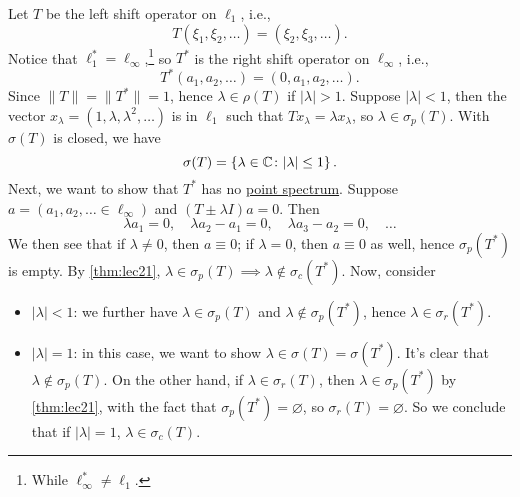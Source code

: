 \begin{eg}
	Let \(T\) be the left shift operator on \(\ell _1\), i.e.,
	\[
		T(\xi _1, \xi _2, \ldots  )= (\xi _2, \xi _3, \ldots  ).
	\]
	Notice that \(\ell _1^{\ast} = \ell _\infty \),\footnote{While \(\ell ^{\ast} _\infty \neq \ell _1\).} so \(T^{\ast} \) is the right shift operator on \(\ell _\infty \), i.e.,
	\[
		T^{\ast} (a_1, a_2, \ldots  ) = (0, a_1, a_2, \ldots  ).
	\]
	Since \(\lVert T \rVert = \lVert T^{\ast}  \rVert = 1\), hence \(\lambda \in \rho (T)\) if \(\vert \lambda  \vert > 1\). Suppose \(\vert \lambda  \vert < 1\), then the vector \(x_\lambda = (1, \lambda , \lambda ^{2} , \ldots  )\) is in \(\ell _1\) such that \(Tx_\lambda = \lambda x_\lambda \), so \(\lambda \in \sigma _p(T)\). With \(\sigma (T)\) is closed, we have
	\[
		\sigma (T) = \left\{ \lambda \in \mathbb{\MakeUppercase{c}} \colon \vert \lambda  \vert \leq 1 \right\} .
	\]
	Next, we want to show that \(T^{\ast} \) has no \hyperref[def:point-spectrum]{point spectrum}. Suppose \(a=(a_1, a_2, \ldots  \in \ell _\infty )\) and \((T\pm \lambda I)a=0\). Then
	\[
		\lambda a_1 = 0,\quad
		\lambda a_2 - a_1 = 0,\quad
		\lambda a_3 - a_2 = 0,\quad \ldots
	\]
	We then see that if \(\lambda \neq 0\), then \(a\equiv 0\); if \(\lambda = 0\), then \(a\equiv 0\) as well, hence \(\sigma _p(T^{\ast} )\) is empty. By \autoref{thm:lec21}, \(\lambda \in \sigma _p(T) \implies \lambda \notin \sigma _c(T^{\ast} )\). Now, consider
	\begin{itemize}
		\item \(\vert \lambda  \vert < 1\): we further have \(\lambda \in \sigma _p(T)\) and \(\lambda \notin \sigma _p(T^{\ast} )\), hence \(\lambda \in \sigma _r(T^{\ast} )\).
		\item \(\vert \lambda  \vert = 1\): in this case, we want to show \(\lambda \in \sigma (T) = \sigma (T^{\ast} )\). It's clear that \(\lambda \notin \sigma _p(T)\). On the other hand, if \(\lambda \in \sigma _r(T)\), then \(\lambda \in \sigma _p(T^{\ast} )\) by \autoref{thm:lec21}, with the fact that \(\sigma _p(T^{\ast} ) = \varnothing \), so \(\sigma _r(T) = \varnothing \). So we conclude that if \(\vert \lambda \vert = 1\), \(\lambda \in \sigma _c(T)\).


\end{itemize}
\end{eg}
